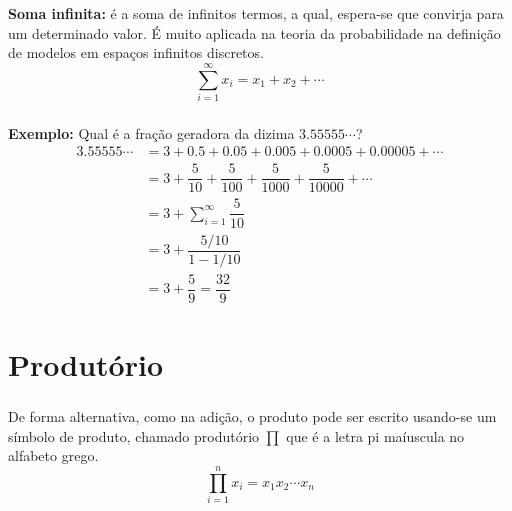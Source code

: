 \documentclass[14pt,aspectratio=1610]{beamer}
\begin{document}
\begin{frame}{}
\frametitle{}
\begin{block}{}
\justifying
{\bf Soma infinita:} é a soma de infinitos termos, a qual, espera-se que convirja para um determinado
valor. É muito aplicada na teoria da probabilidade na definição de modelos em espaços infinitos discretos.
$${\displaystyle \sum_{i=1}^{\infty}x_{i}=x_{1}+x_{2}+\cdots}$$
\end{block}
\end{frame}

\begin{frame}{}
\frametitle{}
\begin{block}{}
\justifying
{\bf Exemplo:} Qual é a fração geradora da dizima $3.55555\cdots$?
\begin{align*}
3.55555\cdots &=3+0.5+0.05+0.005+0.0005+0.00005+\cdots\\
&=3+\dfrac{5}{10}+\dfrac{5}{100}+\dfrac{5}{1000}+\dfrac{5}{10000}+\cdots\\
&=3+{\displaystyle \sum_{i=1}^{\infty}\dfrac{5}{10}}\\
&=3+\dfrac{5/10}{1-1/10}\\
&=3+\dfrac{5}{9}=\dfrac{32}{9}
\end{align*}
\end{block}
\end{frame}

\section{Produtório}
\begin{frame}{}
\frametitle{}
\begin{block}{}
\justifying
De forma alternativa, como na adição, o produto pode ser escrito usando-se um símbolo de produto, chamado 
produtório $\prod$ que é a letra pi maíuscula no alfabeto grego.
$${\displaystyle \prod_{i=1}^{n}x_{i}=x_{1}x_{2}\cdots x_{n}}$$
\end{block}
\end{frame}

% 
\end{document}
